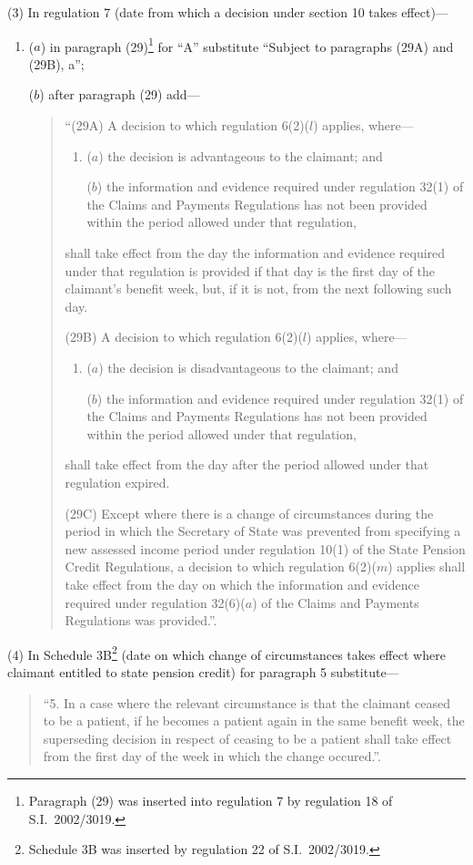 \documentclass[12pt,a4paper]{article}
\begin{document}
(3) In regulation 7 (date from which a decision under section 10 takes effect)—
\begin{enumerate}\item[]
($a$) in paragraph (29)\footnote{Paragraph (29) was inserted into regulation 7 by regulation 18 of S.I.\ 2002/3019.} for “A” substitute “Subject to paragraphs (29A) and (29B), a”;

($b$) after paragraph (29) add—
\begin{quotation}
“(29A) A decision to which regulation 6(2)($l$)  applies, where—
\begin{enumerate}\item[]
($a$) the decision is advantageous to the claimant; and

($b$) the information and evidence required under regulation 32(1) of the Claims and Payments Regulations has not been provided within the period allowed under that regulation,
\end{enumerate}
shall take effect from the day the information and evidence required under that regulation is provided if that day is the first day of the claimant’s benefit week, but, if it is not, from the next following such day.

(29B) A decision to which regulation 6(2)($l$)  applies, where—
\begin{enumerate}\item[]
($a$) the decision is disadvantageous to the claimant; and

($b$) the information and evidence required under regulation 32(1) of the Claims and Payments Regulations has not been provided within the period allowed under that regulation,
\end{enumerate}
shall take effect from the day after the period allowed under that regulation expired.

(29C) Except where there is a change of circumstances during the period in which the Secretary of State was prevented from specifying a new assessed income period under regulation 10(1) of the State Pension Credit Regulations, a decision to which regulation 6(2)($m$)  applies shall take effect from the day on which the information and evidence required under regulation 32(6)($a$)  of the Claims and Payments Regulations was provided.”.
\end{quotation}
\end{enumerate}

(4) In Schedule 3B\footnote{Schedule 3B was inserted by regulation 22 of S.I.\ 2002/3019.} (date on which change of circumstances takes effect where claimant entitled to state pension credit) for paragraph 5 substitute—
\begin{quotation}
“5.  In a case where the relevant circumstance is that the claimant ceased to be a patient, if he becomes a patient again in the same benefit week, the superseding decision in respect of ceasing to be a patient shall take effect from the first day of the week in which the change occured.”.
\end{quotation}
\end{document}
